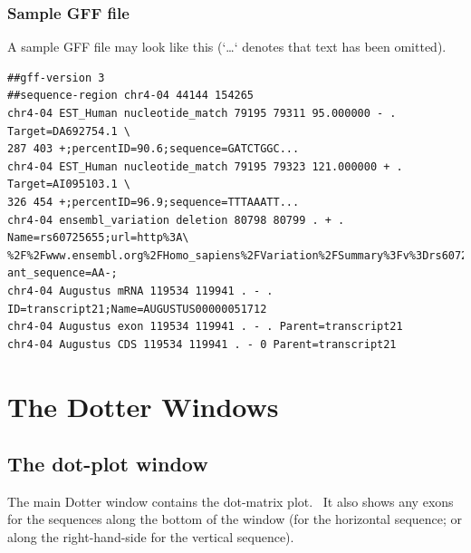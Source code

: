 \documentclass{report}
\begin{document}
\bigskip
{\color[rgb]{0.30980393,0.5058824,0.7411765}\subsubsection{Sample GFF file}}
{A sample GFF file may look like this ({\textquoteleft}{\dots}{\textquoteleft} denotes that text has been
omitted).}

\begin{verbatim}
##gff-version 3
##sequence-region chr4-04 44144 154265
chr4-04 EST_Human nucleotide_match 79195 79311 95.000000 - . Target=DA692754.1 \
287 403 +;percentID=90.6;sequence=GATCTGGC...
chr4-04 EST_Human nucleotide_match 79195 79323 121.000000 + . Target=AI095103.1 \
326 454 +;percentID=96.9;sequence=TTTAAATT...
chr4-04 ensembl_variation deletion 80798 80799 . + . Name=rs60725655;url=http%3A\
%2F%2Fwww.ensembl.org%2FHomo_sapiens%2FVariation%2FSummary%3Fv%3Drs60725655;vari\
ant_sequence=AA-;
chr4-04 Augustus mRNA 119534 119941 . - . ID=transcript21;Name=AUGUSTUS00000051712
chr4-04 Augustus exon 119534 119941 . - . Parent=transcript21
chr4-04 Augustus CDS 119534 119941 . - 0 Parent=transcript21
\end{verbatim}

{\color[rgb]{0.0,0.27058825,0.5254902}\section[The Dotter Windows]{The Dotter Windows}}
{\color[rgb]{0.30980393,0.5058824,0.7411765}\subsection[The dot{}-plot window]{The dot-plot window}}
{The main Dotter window contains the dot-matrix plot. \ It also shows any
exons for the sequences along the bottom of the window (for the
horizontal sequence; or along the right-hand-side for the vertical
sequence).}
\end{document}

